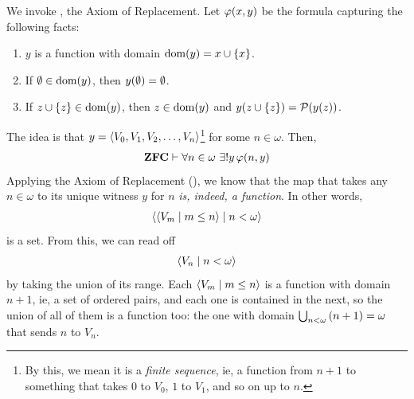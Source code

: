 We invoke , the Axiom of Replacement. Let $\varphi\!\left( x, y \right)$ be the formula capturing the following facts:
\begin{enumerate}
    \item $y$ is a function with domain $\operatorname{dom}\!\left( y \right) = x \cup \left\{ x \right\}$.
    \item If $\emptyset \in \operatorname{dom}\!\left( y \right)$, then $y\!\left( \emptyset \right) = \emptyset$.
    \item If $z \cup \left\{ z \right\} \in \operatorname{dom}\!\left( y \right)$, then $z \in \operatorname{dom}\!\left( y \right)$ and $y\!\left( z \cup \left\{ z \right\} \right) = \mathcal{P}\!\left( y\!\left( z \right) \right)$.
\end{enumerate}
The idea is that $y = \left\langle V_0, V_1, V_2, \ldots, V_{n} \right\rangle$\footnote{By this, we mean it is a \textit{finite sequence}, ie, a function from $n + 1$ to something that takes $0$ to $V_{0}$, $1$ to $V_{1}$, and so on up to $n$.} for some $n \in \omega$. Then,
\begin{align*}
    \mathbf{ZFC} \vdash \forall n \in \omega \ \exists! y \, \varphi\!\left( n, y \right)
\end{align*}
Applying the Axiom of Replacement (), we know that the map that takes any $n \in \omega$ to its unique witness $y$ for $n$ \textit{is, indeed, a function}. In other words,
\begin{align*}
    \left\langle \left\langle V_m \; \middle| \; m \leq n \right\rangle \; \middle| \; n < \omega \right\rangle
\end{align*}
is a set. From this, we can read off
\begin{align*}
    \left\langle V_n \; \middle| \; n < \omega \right\rangle
\end{align*}
by taking the union of its range. Each $\left\langle V_m \; \middle| \; m \leq n \right\rangle$ is a function with domain $n + 1$, ie, a set of ordered pairs, and each one is contained in the next, so the union of all of them is a function too: the one with domain $\bigcup_{n < \omega} \left( n + 1 \right) = \omega$ that sends $n$ to $V_n$.

